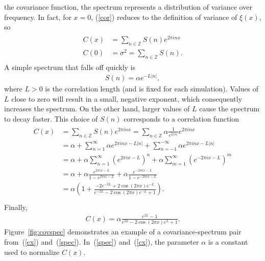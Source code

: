 the covariance function, the spectrum represents a distribution of variance over
frequency. In fact, for $x=0$, (\ref{cor}) reduces to the definition
of variance of $\xi(x)$, so 
\begin{align*}
\begin{split}
C(x) &= \sum_{n\in \mathbb{Z}}S(n)e^{2\pi inx}\\
C(0) &= \sigma^2 = \sum_{n\in \mathbb{Z}}S(n).
\end{split}
\end{align*}
A simple spectrum that falls off quickly is
\begin{align}\label{spec}
S(n)=\alpha e^{-L|n|},
\end{align}
where $L > 0$ is the correlation length (and is fixed
for each simulation). Values of $L$ close to zero will result in a
small, negative exponent, which consequently increases the
spectrum. On the other hand, larger values of $L$ cause
the spectrum to decay faster. This choice of $S(n)$ corresponds to a correlation function
\begin{align*}
\begin{split}
C(x) &= \sum_{n\in \mathbb{Z}}S(n)e^{2\pi inx}=\sum_{n\in \mathbb{Z}}\alpha \frac{1}{e^{L|n|}}e^{2\pi inx}\\
&= \alpha + \sum_{n=1}^{\infty}\alpha e^{2\pi
  inx-L|n|}+\sum_{n=-1}^{-\infty}\alpha e^{2\pi inx-L|n|}\\
&= \alpha+\alpha \sum_{n=1}^{\infty}(e^{2\pi ix-L})^n+\alpha \sum_{m=1}^{\infty}(e^{-2\pi ix-L})^m\\
&=\alpha + \alpha \frac{e^{2\pi ix-L}}{1-e^{2\pi ix-L}} +\alpha
\frac{e^{-2\pi ix-L}}{1-e^{-2\pi ix-L}}\\
&=\alpha \left(1+ \frac{-2e^{-2L}+2\cos(2\pi x)e^{-L}}{e^{-2L}-2\cos(2\pi x)e^{-L}+1} \right).\\
\end{split}
\end{align*}
Finally,
\begin{align}\label{cx}
C(x)= \alpha \frac{e^{2L}-1}{e^{2L}-2\cos(2\pi x)e^L+1}.
\end{align}
Figure~\ref{fig:covspec} demonstrates an example of a covariance-spectrum
pair from~(\ref{cx}) and~(\ref{spec}). In~(\ref{spec}) and~(\ref{cx}), the parameter $\alpha$ is a constant used to normalize
$C(x)$.
